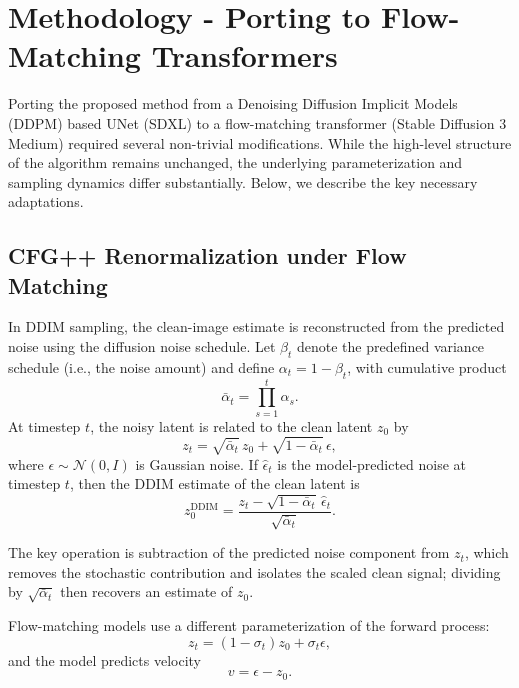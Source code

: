 \documentclass[acmtog]{acmart}
\begin{document}
\section{Methodology - Porting to Flow-Matching Transformers}

Porting the proposed method from a Denoising Diffusion Implicit Models (DDPM) based UNet (SDXL) to a flow-matching transformer (Stable Diffusion 3 Medium) required several non-trivial modifications. While the high-level structure of the algorithm remains unchanged, the underlying parameterization and sampling dynamics differ substantially. Below, we describe the key necessary adaptations.

\subsection{CFG++ Renormalization under Flow Matching}

In DDIM sampling, the clean-image estimate is reconstructed from the predicted noise using the diffusion noise schedule. Let \(\beta_t\) denote the predefined variance schedule (i.e., the noise amount) and define \(\alpha_t = 1-\beta_t\), with cumulative product
\[
\bar\alpha_t=\prod_{s=1}^{t}\alpha_s.
\]
At timestep \(t\), the noisy latent is related to the clean latent \(z_0\) by
\begin{equation}
z_t=\sqrt{\bar\alpha_t}\,z_0+\sqrt{1-\bar\alpha_t}\,\epsilon,
\end{equation}
where \(\epsilon\sim\mathcal N(0,I)\) is Gaussian noise. If \(\hat\epsilon_t\) is the model-predicted noise at timestep \(t\), then the DDIM estimate of the clean latent is
\begin{equation}
z_0^{\mathrm{DDIM}}
=
\frac{z_t-\sqrt{1-\bar\alpha_t}\,\hat\epsilon_t}{\sqrt{\bar\alpha_t}}.
\end{equation}

The key operation is subtraction of the predicted noise component from \(z_t\), which removes the stochastic contribution and isolates the scaled clean signal; dividing by \(\sqrt{\bar\alpha_t}\) then recovers an estimate of \(z_0\).

Flow-matching models use a different parameterization of the forward process:
\begin{equation}
z_t = (1 - \sigma_t) z_0 + \sigma_t \epsilon,
\end{equation}
and the model predicts velocity
\begin{equation}
v = \epsilon - z_0.
\end{equation}
\end{document}
